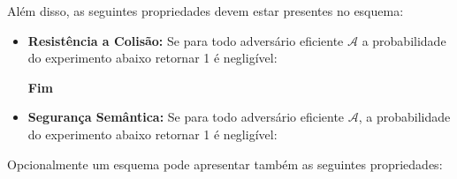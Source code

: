 \documentclass[a4paper]{article}
\begin{document}
Além disso, as seguintes propriedades devem estar presentes no
esquema:

\begin{itemize}
\item\textbf{Resistência a Colisão: }Se para todo adversário eficiente
  $\mathcal{A}$ a probabilidade do experimento abaixo retornar 1 é
  negligível:

  \noindent
  \begin{algorithm}[H]
    \SetAlgoLined
     \textbf{Fim}
  \end{algorithm}
  
\item\textbf{Segurança Semântica: }Se para todo adversário eficiente
  $\mathcal{A}$, a probabilidade do experimento abaixo retornar 1 é
  negligível:

  \noindent
  \begin{algorithm}[H]
    \SetAlgoLined
     
  \end{algorithm}
\end{itemize}

Opcionalmente um esquema pode apresentar também as seguintes
propriedades:
\end{document}
